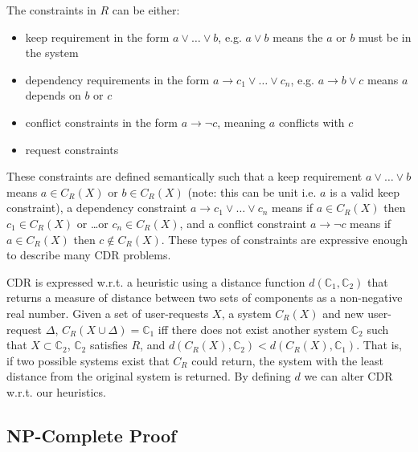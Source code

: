 The constraints in $R$ can be either: 
\begin{itemize}
  \item keep requirement in the form $a \vee \ldots \vee b$, e.g. $a \vee b$ means the $a$ or $b$ must be in the system
  \item dependency requirements in the form $a \rightarrow c_1 \vee \ldots \vee c_n$, e.g. $a \rightarrow b \vee c$ means $a$ depends on $b$ or $c$
  \item conflict constraints in the form $a \rightarrow \neg c$, meaning $a$ conflicts with $c$
  \item request constraints %
\end{itemize}
These constraints are defined semantically such that
a keep requirement  $a \vee \ldots \vee b$ means $a \in C_R(X)$ or $b \in C_R(X)$ (note: this can be unit i.e. $a$ is a valid keep constraint),
a dependency constraint $a \rightarrow c_1 \vee \ldots \vee c_n$ means if $a \in C_R(X)$ then $c_1 \in C_R(X)$ or \ldots or $c_n \in C_R(X)$,
and a conflict constraint $a \rightarrow \neg c$ means if $a \in C_R(X)$ then $c \not \in C_R(X)$.
These types of constraints are expressive enough to describe many CDR problems.

CDR is expressed w.r.t. a heuristic using a distance function $d(\mathbb{C}_1,\mathbb{C}_2)$ 
that returns a measure of distance between two sets of components as a non-negative real number.
Given a set of user-requests $X$, a system $C_R(X)$ and new user-request $\Delta$,
$C_R(X \cup \Delta) = \mathbb{C}_1$ iff there does not exist another system $\mathbb{C}_2$ such that $X \subset \mathbb{C}_2$, $\mathbb{C}_2$ satisfies $R$, 
and $d(C_R(X),\mathbb{C}_2) < d(C_R(X),\mathbb{C}_1)$.
That is, if two possible systems exist that $C_R$ could return, the system with the least distance from the original system is returned. 
By defining $d$ we can alter CDR w.r.t. our heuristics.


\subsection{NP-Complete Proof}

